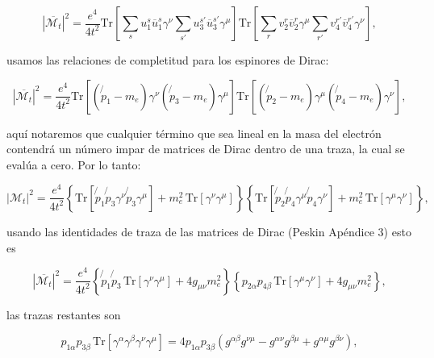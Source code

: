 \begin{equation}
|\overline{\mathcal{M}_t}|^2 = \frac{e^4}{4t^2} \text{Tr} \left[ \sum_s u_1^s \overline{u}_1^s \gamma^\nu \sum_{s'} u_3^{s'} \overline{u}_3^{s'} \gamma^\mu \right] \text{Tr} \left[ \sum_r v_2^r \overline{v}_2^r \gamma^\mu \sum_{r'} v_4^{r'} \overline{v}_4^{r'} \gamma^\nu \right],
\end{equation}

usamos las relaciones de completitud para los espinores de Dirac:

\begin{equation}
|\overline{\mathcal{M}_t}|^2 = \frac{e^4}{4t^2} \text{Tr} \left[ (\not{p}_1 - m_e) \gamma^\nu (\not{p}_3 - m_e) \gamma^\mu \right] \text{Tr} \left[ (\not{p}_2 - m_e) \gamma^\mu (\not{p}_4 - m_e) \gamma^\nu \right],
\end{equation}

aquí notaremos que cualquier término que sea lineal en la masa del electrón contendrá un número impar de matrices de Dirac dentro de una traza, la cual se evalúa a cero. Por lo tanto:

\begin{equation}
|\mathcal{M}_t|^2 = \frac{e^4}{4t^2} \left\{ \text{Tr} \left[ \not{p}_1 \not{p}_3 \gamma^\nu \not{p}_3 \gamma^\mu \right] + m_e^2 \, \text{Tr} \left[ \gamma^\nu \gamma^\mu \right] \right\} \left\{ \text{Tr} \left[ \not{p}_2 \not{p}_4 \gamma^\mu \not{p}_4 \gamma^\nu \right] + m_e^2 \, \text{Tr} \left[ \gamma^\mu \gamma^\nu \right] \right\},
\end{equation}

usando las identidades de traza de las matrices de Dirac (Peskin Apéndice 3) esto es

\begin{equation}
|\overline{\mathcal{M}_t}|^2 = \frac{e^4}{4t^2} \left\{ \not{p}_1 \not{p}_3 \, \text{Tr} \left[ \gamma^\nu \gamma^\mu \right] + 4 g_{\mu \nu} m_e^2 \right\} \left\{  p_{2\alpha} p_{4\beta} \, \text{Tr} \left[ \gamma^\mu \gamma^\nu \right] + 4 g_{\mu \nu} m_e^2 \right\},
\end{equation}

las trazas restantes son

\begin{equation}
p_{1\alpha} p_{3\beta} \, \text{Tr} \left[ \gamma^\alpha \gamma^\beta \gamma^\nu \gamma^\mu \right] = 4 p_{1 \alpha} p_{3 \beta} \left( g^{\alpha \beta} g^{\nu \mu} - g^{\alpha \nu} g^{\beta \mu} + g^{\alpha \mu} g^{\beta \nu} \right),
\end{equation}


